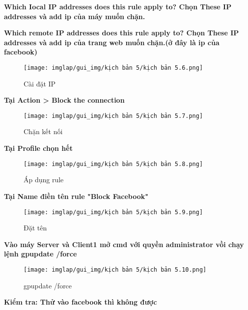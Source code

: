 \documentclass[13pt]{article}
\begin{document}
        \textbf{Which Iocal IP addresses does this rule apply to? Chọn These IP addresses và add ip của máy muốn chặn.} 
        
        \textbf{Which remote IP addresses does this rule apply to? Chọn These IP addresses và add ip của trang web muốn chặn.(ở đây là ip của facebook)} 
\begin{figure}[H]
    \centering
    \texttt{[image: imglap/gui\_img/kịch bản 5/kịch bản 5.6.png]}
    \caption{Cài đặt IP}
    \label{fig:enter-label}
\end{figure}
\newpage
\textbf{Tại Action > Block the connection} 
\begin{figure}[H]
     \centering
     \texttt{[image: imglap/gui\_img/kịch bản 5/kịch bản 5.7.png]}
     \caption{Chặn kết nối}
     \label{fig:enter-label}
 \end{figure}
\newpage
  \textbf{Tại Profile chọn hết} 
\begin{figure}[H]
                    \centering
                    \texttt{[image: imglap/gui\_img/kịch bản 5/kịch bản 5.8.png]}
                    \caption{Áp dụng rule}
                    \label{fig:enter-label}
                \end{figure}
\newpage
\textbf{Tại Name điền tên rule "Block Facebook"} 
\begin{figure}[H]
                                    \centering
                                    \texttt{[image: imglap/gui\_img/kịch bản 5/kịch bản 5.9.png]}
                                    \caption{Đặt tên}
                                    \label{fig:enter-label}
                                \end{figure}
\newpage
\textbf{Vào máy Server và Client1 mở cmd với quyền administrator vồi chạy lệnh gpupdate /force} 
\begin{figure}[H]
                                                                    \centering
                                                                    \texttt{[image: imglap/gui\_img/kịch bản 5/kịch bản 5.10.png]}
                                                                    \caption{gpupdate /force}
                                                                    \label{fig:enter-label}
                                                                \end{figure}
\textbf{Kiểm tra: Thử vào facebook thì không được} 
\end{document}
